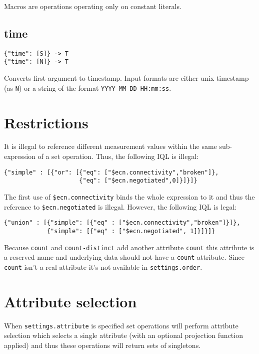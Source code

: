 \documentclass[a4paper]{article}
\begin{document}
Macros are operations operating only on constant literals.

\subsection{time}

\begin{verbatim}
{"time": [S]} -> T
{"time": [N]} -> T
\end{verbatim}

Converts first argument to timestamp. Input formats are either unix timestamp (as \verb|N|) or a
string of the format \verb|YYYY-MM-DD HH:mm:ss|. 

\section{Restrictions}

It is illegal to reference different measurement values within the
same sub-expression of a set operation. Thus, the following IQL is
illegal:

\begin{verbatim}
{"simple" : [{"or": [{"eq": ["$ecn.connectivity","broken"]},
                     {"eq": ["$ecn.negotiated",0]}]}]}
\end{verbatim}

The first use of
\verb|$ecn.connectivity| binds the whole expression to it and thus the
reference to \verb|$ecn.negotiated| is illegal. However, the following
IQL is legal:

\begin{verbatim}
{"union" : [{"simple": [{"eq" : ["$ecn.connectivity","broken"]}]},
            {"simple": [{"eq" : ["$ecn.negotiated", 1]}]}]}
\end{verbatim}

Because \verb|count| and \verb|count-distinct| add another attribute \verb|count| this attribute
is a reserved name and underlying data should not have a \verb|count| attribute. Since \verb|count| isn't
a real attribute it's not available in \verb|settings.order|.

\section{Attribute selection}

When \verb|settings.attribute| is specified set operations will
perform attribute selection which selects a single attribute (with an
optional projection function applied) and thus these operations will
return sets of singletons.
\end{document}
